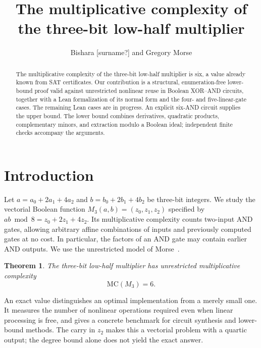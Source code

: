 \documentclass[11pt,a4paper]{article}
\title{The multiplicative complexity of the three-bit low-half multiplier}
\author{Bishara [surname?] and Gregory Morse}
\date{}
\theoremstyle{plain}
\newtheorem{theorem}{Theorem}
\theoremstyle{remark}
\begin{document}
\maketitle
\begin{abstract}
The multiplicative complexity of the three-bit low-half multiplier is six, a value already known from SAT certificates. Our contribution is a structural, enumeration-free lower-bound proof valid against unrestricted nonlinear reuse in Boolean XOR--AND circuits, together with a Lean formalization of its normal form and the four- and five-linear-gate cases. The remaining Lean cases are in progress. An explicit six-AND circuit supplies the upper bound. The lower bound combines derivatives, quadratic products, complementary minors, and extraction modulo a Boolean ideal; independent finite checks accompany the arguments.
\end{abstract}
\setcounter{tocdepth}{1}
\tableofcontents

\section{Introduction}\label{sec:introduction}
Let $a=a_0+2a_1+4a_2$ and $b=b_0+2b_1+4b_2$ be three-bit integers. We study the vectorial Boolean function $M_3(a,b)=(z_0,z_1,z_2)$ specified by $ab\bmod8=z_0+2z_1+4z_2$. Its multiplicative complexity counts two-input AND gates, allowing arbitrary affine combinations of inputs and previously computed gates at no cost. In particular, the factors of an AND gate may contain earlier AND outputs. We use the unrestricted model of Morse~\cite{morse}.

\begin{theorem}\label{thm:MC}
The three-bit low-half multiplier has unrestricted multiplicative complexity
\[
\mathrm{MC}(M_3)=6.
\]
\end{theorem}

An exact value distinguishes an optimal implementation from a merely small one. It measures the number of nonlinear operations required even when linear processing is free, and gives a concrete benchmark for circuit synthesis and lower-bound methods. The carry in $z_2$ makes this a vectorial problem with a quartic output; the degree bound alone does not yield the exact answer.
\end{document}
